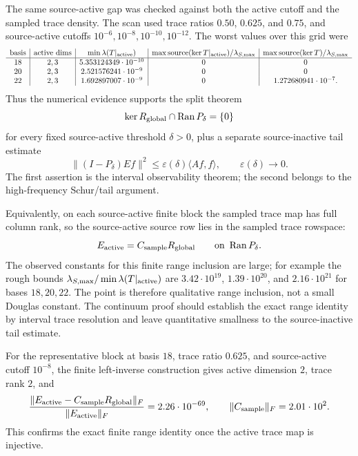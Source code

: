 \documentclass[11pt]{article}
\begin{document}
The same source-active gap was checked against both the active cutoff and the
sampled trace density.  The scan used trace ratios \(0.50\), \(0.625\), and
\(0.75\), and source-active cutoffs \(10^{-6},10^{-8},10^{-10},10^{-12}\).
The worst values over this grid were
\[
\begin{array}{c|c|c|c|c}
\operatorname{basis}&\operatorname{active\ dims}&
\min \lambda(T|_{\rm active})&
\max {\rm source}(\ker T|_{\rm active})/\lambda_{S,\max}&
\max {\rm source}(\ker T)/\lambda_{S,\max}\\\hline
18&2,3&5.353124349\cdot10^{-10}&0&0\\
20&2,3&2.521576241\cdot10^{-9}&0&0\\
22&2,3&1.692897007\cdot10^{-9}&0&1.272680941\cdot10^{-7}.
\end{array}
\]
Thus the numerical evidence supports the split theorem
\[
\ker R_{\rm global}\cap\operatorname{Ran}P_\delta=\{0\}
\]
for every fixed source-active threshold \(\delta>0\), plus a separate
source-inactive tail estimate
\[
  \|(I-P_\delta)E f\|^2\le \varepsilon(\delta)\langle Af,f\rangle,
  \qquad \varepsilon(\delta)\to0.
\]
The first assertion is the interval observability theorem; the second belongs
to the high-frequency Schur/tail argument.

Equivalently, on each source-active finite block the sampled trace map has full
column rank, so the source-active source row lies in the sampled trace rowspace:
\[
  E_{\rm active}=C_{\rm sample}R_{\rm global}
  \qquad\hbox{on }\operatorname{Ran}P_\delta .
\]
The observed constants for this finite range inclusion are large; for example
the rough bounds \(\lambda_{S,\max}/\min\lambda(T|_{\rm active})\) are
\(3.42\cdot10^{19}\), \(1.39\cdot10^{20}\), and \(2.16\cdot10^{21}\) for
bases \(18,20,22\).  The point is therefore qualitative range inclusion, not a
small Douglas constant.  The continuum proof should establish the exact range
identity by interval trace resolution and leave quantitative smallness to the
source-inactive tail estimate.

For the representative block at basis \(18\), trace ratio \(0.625\), and
source-active cutoff \(10^{-8}\), the finite left-inverse construction gives
active dimension \(2\), trace rank \(2\), and
\[
  {\|E_{\rm active}-C_{\rm sample}R_{\rm global}\|_F\over
   \|E_{\rm active}\|_F}
  =2.26\cdot10^{-69},
  \qquad
  \|C_{\rm sample}\|_F=2.01\cdot10^2.
\]
This confirms the exact finite range identity once the active trace map is
injective.
\end{document}
